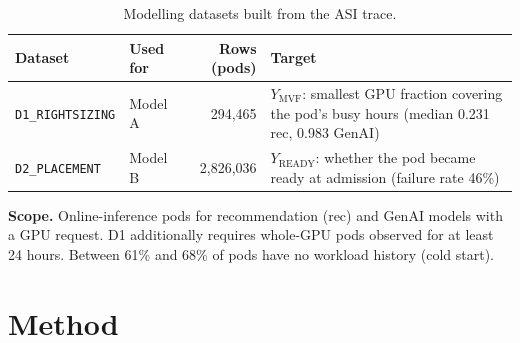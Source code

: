 \documentclass[11pt]{article}
\begin{document}
\begin{table}[h]
\centering\small
\caption{Modelling datasets built from the ASI trace.}
\label{tab:datasets}
\begin{tabularx}{\linewidth}{@{}lp{1.4cm}rL@{}}
\toprule
Dataset & Used for & Rows (pods) & Target \\
\midrule
\texttt{D1\_RIGHTSIZING} & Model A & 294{,}465 & $Y_{\text{MVF}}$: smallest GPU fraction covering the pod's busy hours (median 0.231 rec, 0.983 GenAI) \\
\texttt{D2\_PLACEMENT} & Model B & 2{,}826{,}036 & $Y_{\text{READY}}$: whether the pod became ready at admission (failure rate 46\%) \\
\bottomrule
\end{tabularx}
\end{table}

\noindent\textbf{Scope.} Online-inference pods for recommendation (rec) and GenAI models with a GPU request. D1 additionally requires whole-GPU pods observed for at least 24 hours. Between 61\% and 68\% of pods have no workload history (cold start).

\section{Method}
\label{sec:method}
\end{document}
